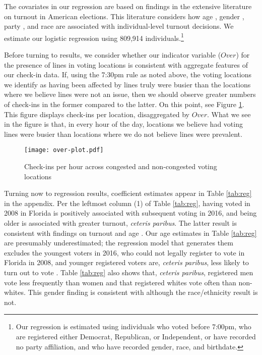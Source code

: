 \documentclass[12pt,titlepage]{article}
\begin{document}
The covariates in our regression are based on findings in the
extensive literature on turnout in American elections. This literature
considers how age \citep{strateetal:age,hightonwolfinger:lifecycle},
gender \citep{schlozman:genderdifferentvoice}, party
\citep{martinezgill:partisanturnout,grofmanetal:turnout}, and race
\citep{verbaetal:raceparticipation,fraga:raceturnout} are associated
with individual-level turnout decisions. We estimate our logistic
regression using 809,914 individuals.\footnote{Our regression is
  estimated using individuals who voted before 7:00pm, who are
  registered either Democrat, Republican, or Independent, or have
  recorded no party affiliation, and who have recorded gender, race,
  and birthdate.}

Before turning to results, we consider whether our indicator variable
($Over$) for the presence of lines in voting locations is consistent
with aggregate features of our check-in data. If, using the 7:30pm
rule as noted above, the voting locations we identify as having been
affected by lines truly were busier than the locations where we
believe lines were not an issue, then we should observe greater
numbers of check-ins in the former compared to the latter. On this
point, see Figure \ref{fig:overplot}. This figure displays check-ins
per location, disaggregated by $Over$. What we see in the figure is
that, in every hour of the day, locations we believe had voting lines
were busier than locations where we do not believe lines were
prevalent.%

\begin{figure}[!ht]
  \caption{Check-ins per hour across congested and non-congested
    voting locations}
  \label{fig:overplot}
  \centering
    \centering\texttt{[image: over-plot.pdf]}
\end{figure}

Turning now to regression results, coefficient estimates appear in
Table \ref{tab:reg} in the appendix. Per the leftmost column (1) of
Table \ref{tab:reg}, having voted in 2008 in Florida is positively
associated with subsequent voting in 2016, and being older is
associated with greater turnout, \emph{ceteris paribus}. The latter
result is consistent with findings on turnout and age
\citep{costaetal:walkingthewalk}. Our age estimates in Table
\ref{tab:reg} are presumably underestimated; the regression model that
generates them excludes the youngest voters in 2016, who could not
legally register to vote in Florida in 2008, and younger registered
voters are, \emph{ceteris paribus}, less likely to turn out to vote
\citep{shinosmith:registrationtiming}. Table \ref{tab:reg} also shows
that, \emph{ceteris paribus}, registered men vote less frequently than
women and that registered whites vote often than non-whites. This
gender finding is consistent with \citet{leighleynagler:whovotesnow}
although the race/ethnicity result is not.
\end{document}
